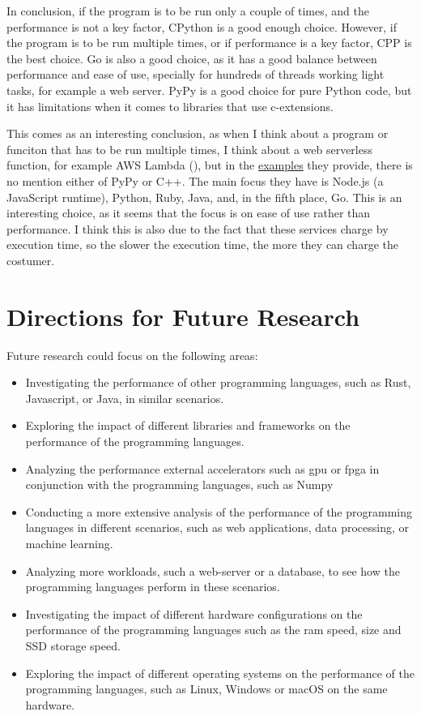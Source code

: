 In conclusion, if the program is to be run only a couple of times, and the performance is not a key factor, \gls{CPython} is a good enough choice. However, if the program is to be run multiple times, or if performance is a key factor, \gls{CPP} is the best choice. Go is also a good choice, as it has a good balance between performance and ease of use, specially for hundreds of threads working light tasks, for example a web server. PyPy is a good choice for pure Python code, but it has limitations when it comes to libraries that use \glspl{c-extension}.

This comes as an interesting conclusion, as when I think about a program or funciton that has to be run multiple times, I think about a web serverless function, for example AWS Lambda (\cite{aws:lambda}), but in the \href{https://docs.aws.amazon.com/lambda/latest/dg/lambda-samples.html}{examples} they provide, there is no mention either of PyPy or C++. The main focus they have is Node.js (a JavaScript runtime), Python, Ruby, Java, and, in the fifth place, Go. This is an interesting choice, as it seems that the focus is on ease of use rather than performance. I think this is also due to the fact that these services charge by execution time, so the slower the execution time, the more they can charge the costumer. 


\section{Directions for Future Research}
Future research could focus on the following areas:
\begin{itemize}
    \item Investigating the performance of other programming languages, such as Rust, Javascript, or Java, in similar scenarios.
    \item Exploring the impact of different libraries and frameworks on the performance of the programming languages.
    \item Analyzing the performance external accelerators such as \gls{gpu} or \gls{fpga} in conjunction with the programming languages, such as Numpy
    \item Conducting a more extensive analysis of the performance of the programming languages in different scenarios, such as web applications, data processing, or machine learning.
    \item Analyzing more workloads, such a web-server or a database, to see how the programming languages perform in these scenarios.
    \item Investigating the impact of different hardware configurations on the performance of the programming languages such as the \gls{ram} speed, size and SSD storage speed.
    \item Exploring the impact of different operating systems on the performance of the programming languages, such as Linux, Windows or macOS on the same hardware.
\end{itemize}